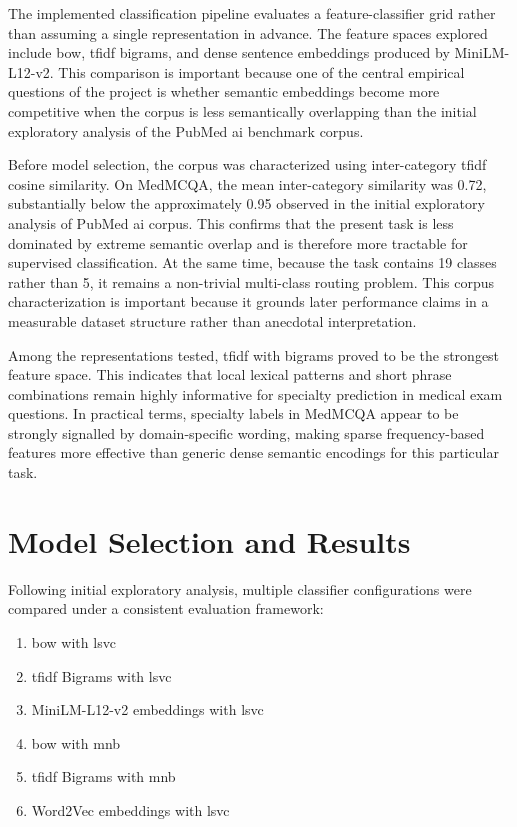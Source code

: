 The implemented classification pipeline evaluates a feature-classifier grid rather than assuming a single representation in advance. The feature spaces explored include \gls{bow}, \gls{tfidf} bigrams, and dense sentence embeddings produced by MiniLM-L12-v2. This comparison is important because one of the central empirical questions of the project is whether semantic embeddings become more competitive when the corpus is less semantically overlapping than the initial exploratory analysis of the PubMed \gls{ai} benchmark corpus. 

Before model selection, the corpus was characterized using inter-category \gls{tfidf} cosine similarity. On MedMCQA, the mean inter-category similarity was 0.72, substantially below the approximately 0.95 observed in the initial exploratory analysis of PubMed \gls{ai} corpus. This confirms that the present task is less dominated by extreme semantic overlap and is therefore more tractable for supervised classification. At the same time, because the task contains 19 classes rather than 5, it remains a non-trivial multi-class routing problem. This corpus characterization is important because it grounds later performance claims in a measurable dataset structure rather than anecdotal interpretation. 

Among the representations tested, \gls{tfidf} with bigrams proved to be the strongest feature space. This indicates that local lexical patterns and short phrase combinations remain highly informative for specialty prediction in medical exam questions. In practical terms, specialty labels in MedMCQA appear to be strongly signalled by domain-specific wording, making sparse frequency-based features more effective than generic dense semantic encodings for this particular task. 

\section{Model Selection and Results}
\label{sec:classification_model_selection}
Following initial exploratory analysis, multiple classifier configurations were compared under a consistent evaluation framework:

\begin{enumerate}
    \item \gls{bow} with \gls{lsvc}
    \item \gls{tfidf} Bigrams with \gls{lsvc}
    \item MiniLM-L12-v2 embeddings with \gls{lsvc}
    \item \gls{bow} with \gls{mnb}
    \item \gls{tfidf} Bigrams with \gls{mnb}
    \item Word2Vec embeddings with \gls{lsvc}
\end{enumerate}

